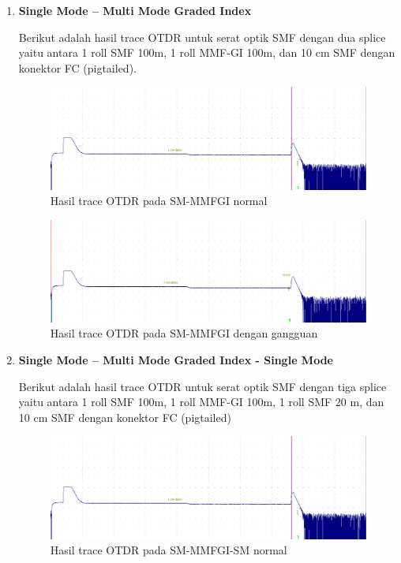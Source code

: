 \documentclass[12pt]{article}
\begin{document}
\begin{enumerate}

\newpage	
		
		\item \textbf{Single Mode – Multi Mode Graded Index}
		
		Berikut adalah hasil trace OTDR untuk serat optik SMF dengan dua splice yaitu antara 1 roll SMF 100m, 1 roll MMF-GI 100m, dan 10 cm SMF dengan konektor FC (pigtailed).
		
		\begin{figure}[h!]
			\centering
			\captionsetup{justification=centering}
			\includegraphics[width=0.5\linewidth]{images/Bab_4/Bab_4_3c1}
			\caption[Trace SM-MMFGI ]{\small{Hasil trace OTDR pada SM-MMFGI normal}}
		\end{figure}
		
		\begin{figure}[h!]
			\centering
			\captionsetup{justification=centering}
			\includegraphics[width=0.5\linewidth]{images/Bab_4/Bab_4_3c2}
			\caption[Trace SM-MMFGI ]{\small{Hasil trace OTDR pada SM-MMFGI dengan gangguan}}
		\end{figure}
		
		\item \textbf{Single Mode – Multi Mode Graded Index - Single Mode }
		
		Berikut adalah hasil trace OTDR untuk serat optik SMF dengan tiga splice yaitu antara 1 roll SMF 100m, 1 roll MMF-GI 100m, 1 roll SMF 20 m, dan 10 cm SMF dengan konektor FC (pigtailed)
		
		\begin{figure}[h!]
			\centering
			\captionsetup{justification=centering}
			\includegraphics[width=0.5\linewidth]{images/Bab_4/Bab_4_3c1}
			\caption[Trace SM-MMFGI-SM]{\small{Hasil trace OTDR pada SM-MMFGI-SM normal}}
		\end{figure}
		

\end{enumerate}
\end{document}
